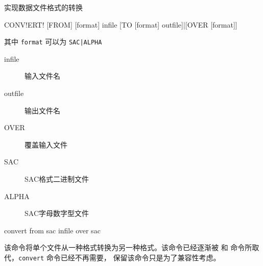 \label{cmd:convert}

实现数据文件格式的转换

\begin{SACSTX}
CONV!ERT! [FROM] [format] infile [TO [format] outfile]|[OVER [format]]
\end{SACSTX}
其中 \texttt{format} 可以为 \texttt{SAC|ALPHA}

\begin{description}
\item [infile] 输入文件名
\item [outfile] 输出文件名
\item [OVER] 覆盖输入文件
\item [SAC] SAC格式二进制文件
\item [ALPHA] SAC字母数字型文件
\end{description}

\begin{SACDFT}
convert from sac infile over sac
\end{SACDFT}

该命令将单个文件从一种格式转换为另一种格式。该命令已经逐渐被 
和  命令所取代，\texttt{convert} 命令已经不再需要，
保留该命令只是为了兼容性考虑。
